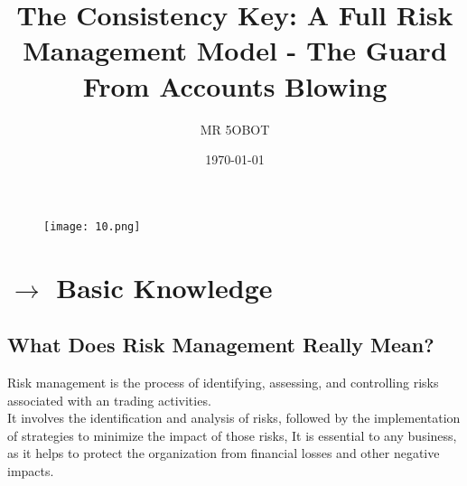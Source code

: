 \documentclass[10pt]{article}           %
\title{The Consistency Key: A Full Risk Management Model - The Guard From Accounts Blowing}
\author{MR 5OBOT}
\date{\today}
\begin{document}
\maketitle
\makeatletter
\def\@makefnmark{\hbox{}}
\makeatother






\begin{figure}[ht]
\begin{center}
   \texttt{[image: 10.png]}
\end{center}
\end{figure}


\section{$\rightarrow$ Basic Knowledge}

\subsection{\small What Does Risk Management Really Mean?}
\small Risk management is the process of identifying, assessing, and controlling risks associated with an trading activities.\\ It involves the identification and analysis of risks, followed by the implementation of strategies to minimize the impact of those risks, It is essential to any business, as it helps to protect the organization from financial losses and other negative impacts.
\end{document}
